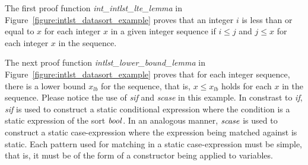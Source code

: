 The first proof function {\it int\_intlst\_lte\_lemma} in
Figure~\ref{figure:intlst_datasort_example} proves that an integer $i$ is
less than or equal to $x$ for each integer $x$ in a given integer sequence
if $i\leq j$ and $j\leq x$ for each integer $x$ in the sequence.

The next proof function {\it intlst\_lower\_bound\_lemma} in
Figure~\ref{figure:intlst_datasort_example} proves that for each integer
sequence, there is a lower bound $x_{lb}$ for the sequence, that is, $x\leq
x_{lb}$ holds for each $x$ in the sequence. Please notice the use of {\it
sif} and {\it scase} in this example. In constrast to {\it if}, {\it sif}
is used to construct a static conditional expression where the condition is
a static expression of the sort ${\it bool}$. In an analogous manner, ${\it
scase}$ is used to construct a static case-expression where the expression
being matched against is static. Each pattern used for matching in a static
case-expression must be simple, that is, it must be of the form of a
constructor being applied to variables.


